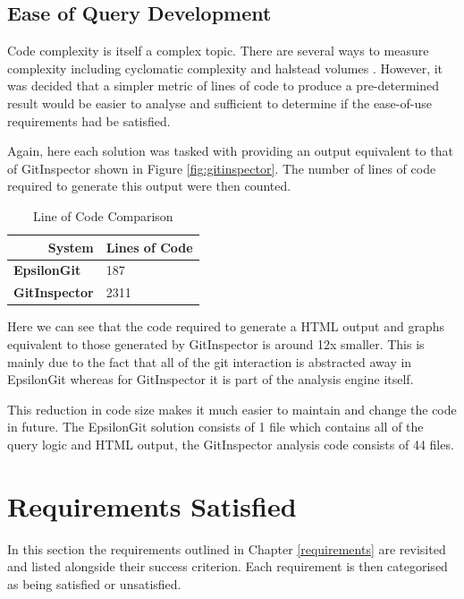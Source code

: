 \documentclass[11pt]{book}
\begin{document}
\subsection{Ease of Query Development}
Code complexity is itself a complex topic. There are several ways to measure complexity including cyclomatic complexity and halstead volumes \cite{halstead}. However, it was decided that a simpler metric of lines of code to produce a pre-determined result would be easier to analyse and sufficient to determine if the ease-of-use requirements had be satisfied.

Again, here each solution was tasked with providing an output equivalent to that of GitInspector shown in Figure \ref{fig:gitinspector}. The number of lines of code required to generate this output were then counted. 

\begin{table}[H]
\centering

\begin{tabular}{|l|l|}
\hline
\multicolumn{1}{|r|}{{\bf System}} & {\bf Lines of Code} \\ \hline
{\bf EpsilonGit}                   & 187                 \\ \hline
{\bf GitInspector}                 & 2311                \\ \hline
\end{tabular}
\caption{Line of Code Comparison}
\label{tab:loc}
\end{table}

Here we can see that the code required to generate a HTML output and graphs equivalent to those generated by GitInspector is around 12x smaller. This is mainly due to the fact that all of the git interaction is abstracted away in EpsilonGit whereas for GitInspector it is part of the analysis engine itself. 

This reduction in code size makes it much easier to maintain and change the code in future. The EpsilonGit solution consists of 1 file which contains all of the query logic and HTML output, the GitInspector analysis code consists of 44 files.

\section{Requirements Satisfied}
In this section the requirements outlined in Chapter \ref{requirements} are revisited and listed alongside their success criterion. Each requirement is then categorised as being satisfied or unsatisfied.
\end{document}
